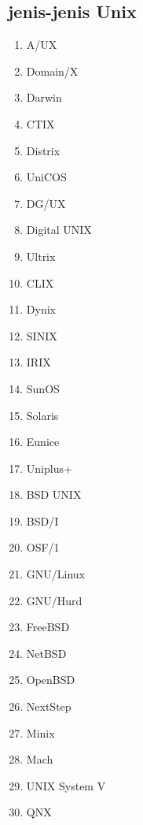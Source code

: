 \subsection{jenis-jenis Unix}

\begin{enumerate}
\item A/UX
\item Domain/X
\item Darwin
\item CTIX
\item Distrix
\item UniCOS
\item DG/UX
\item Digital UNIX
\item Ultrix
\item CLIX
\item Dynix
\item SINIX
\item IRIX
\item SunOS
\item Solaris
\item Eunice
\item Uniplus+
\item BSD UNIX
\item BSD/I
\item OSF/1
\item GNU/Linux
\item GNU/Hurd
\item FreeBSD
\item NetBSD
\item OpenBSD
\item NextStep
\item Minix
\item Mach
\item UNIX System V
\item QNX
\end{enumerate} 